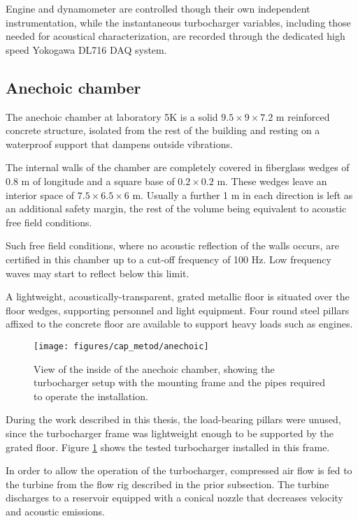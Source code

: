 Engine and dynamometer are controlled though their own independent instrumentation, while the instantaneous turbocharger variables, including those needed for acoustical characterization, are recorded through the dedicated high speed Yokogawa DL716 DAQ system.

\subsection{Anechoic chamber} \label{sub:anec_chamber}

The anechoic chamber at laboratory 5K is a solid $9.5 \times 9 \times 7.2$ m reinforced concrete structure, isolated from the rest of the building and resting on a waterproof support that dampens outside vibrations.

The internal walls of the chamber are completely covered in fiberglass wedges of 0.8 m of longitude and a square base of $0.2 \times 0.2$ m. These wedges leave an interior space of $7.5 \times 6.5 \times 6$ m. Usually a further 1 m in each direction is left as an additional safety margin, the rest of the volume being equivalent to acoustic free field conditions.

Such free field conditions, where no acoustic reflection of the walls occurs, are certified in this chamber up to a cut-off frequency of 100 Hz. Low frequency waves may start to reflect below this limit.

A lightweight, acoustically-transparent, grated metallic floor is situated over the floor wedges, supporting personnel and light equipment. Four round steel pillars affixed to the concrete floor are available to support heavy loads such as engines.

\begin{figure}[t!]
\centering
\texttt{[image: figures/cap\_metod/anechoic]}
\caption[View of the anechoic chamber with the turbocharger setup]{View of the inside of the anechoic chamber, showing the turbocharger setup with the mounting frame and the pipes required to operate the installation.}
\label{fig:anechoic_chamber}
\end{figure}

During the work described in this thesis, the load-bearing pillars were unused, since the turbocharger frame was lightweight enough to be supported by the grated floor. Figure \ref{fig:anechoic_chamber} shows the tested turbocharger installed in this frame.

In order to allow the operation of the turbocharger, compressed air flow is fed to the turbine from the flow rig described in the prior subsection. The turbine discharges to a reservoir equipped with a conical nozzle that decreases velocity and acoustic emissions.

